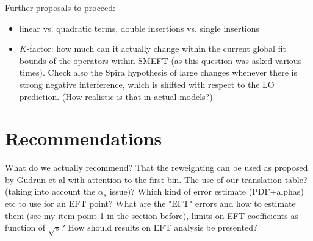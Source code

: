\documentclass[12pt]{article}
\begin{document}
Further proposals to proceed:

\begin{itemize}
\item linear vs. quadratic terms, double insertions vs. single insertions
\item $K$-factor: how much can it actually change within the current global fit bounds of the operators within SMEFT (as this question was asked various times). Check also the Spira hypothesis of large changes whenever there is strong negative interference, which is shifted with respect to the LO prediction. (How realistic is that in actual models?)
\end{itemize}

\section{Recommendations}
What do we actually recommend?
That the reweighting can be used as proposed by Gudrun et al with attention to the first bin.
The use of our translation table? (taking into account the $\alpha_s$ issue)?
Which kind of error estimate (PDF+alphas) etc to use for an EFT point? 
What are the "EFT" errors and how to estimate them (see my item point 1 in the section before), limits on EFT coefficients as function of $\sqrt{s}$?
How should results on EFT analysis be presented?




\end{document}
